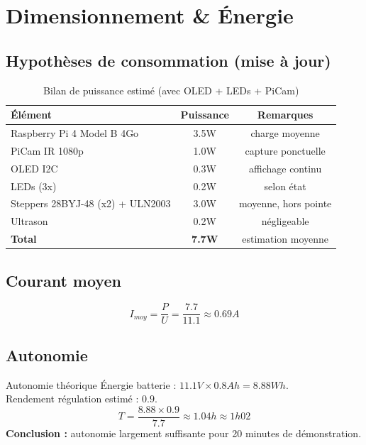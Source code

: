 \documentclass[a4paper,12pt]{report}
\begin{document}
\chapter{Dimensionnement \& Énergie}

\section{Hypothèses de consommation (mise à jour)}
\begin{table}[H]
\centering
\begin{tabular}{|p{6cm}|c|c|}
\hline
\rowcolor{UTGreen!25}\textbf{Élément} & \textbf{Puissance} & \textbf{Remarques} \\ \hline
Raspberry Pi 4 Model B 4Go & 3.5W & charge moyenne \\ \hline
PiCam IR 1080p & 1.0W & capture ponctuelle \\ \hline
OLED I2C & 0.3W & affichage continu \\ \hline
LEDs (3x) & 0.2W & selon état \\ \hline
Steppers 28BYJ-48 (x2) + ULN2003 & 3.0W & moyenne, hors pointe \\ \hline
Ultrason & 0.2W & négligeable \\ \hline
\textbf{Total} & \textbf{7.7W} & estimation moyenne \\ \hline
\end{tabular}
\caption{Bilan de puissance estimé (avec OLED + LEDs + PiCam)}
\end{table}

\section{Courant moyen}
\[
I_{moy}=\frac{P}{U}=\frac{7.7}{11.1}\approx 0.69A
\]

\section{Autonomie}
\begin{calcbox}{Autonomie théorique}
Énergie batterie : \(11.1V \times 0.8Ah = 8.88Wh\).\\
Rendement régulation estimé : \(0.9\).\\[2mm]
\[
T=\frac{8.88\times 0.9}{7.7}\approx 1.04h \approx 1h02
\]
\textbf{Conclusion :} autonomie largement suffisante pour 20 minutes de démonstration.
\end{calcbox}
\end{document}
